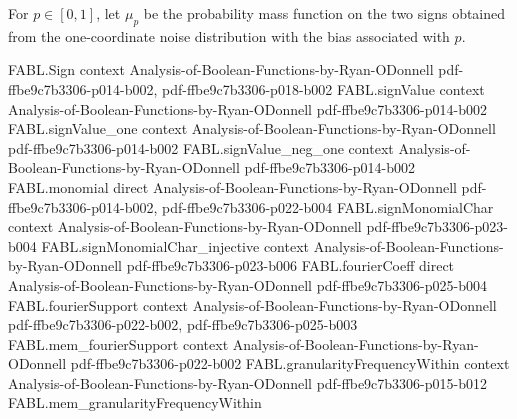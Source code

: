 \begin{definition}
\label{FABL.biasedSignPMF}
\leanok
{}
For $p\in[0,1]$, let $\mu_p$ be the probability mass function on the two signs obtained
from the one-coordinate noise distribution with the bias associated with $p$.
\end{definition}

\begin{theorem}
\label{FABL.biasedSignPMF_apply_one}
\leanok
{}
\proofstep
  {FABL.Sign}
  {context}
  {Analysis-of-Boolean-Functions-by-Ryan-ODonnell}
  {pdf-ffbe9c7b3306-p014-b002,
    pdf-ffbe9c7b3306-p018-b002}
\proofstep
  {FABL.signValue}
  {context}
  {Analysis-of-Boolean-Functions-by-Ryan-ODonnell}
  {pdf-ffbe9c7b3306-p014-b002}
\proofstep
  {FABL.signValue_one}
  {context}
  {Analysis-of-Boolean-Functions-by-Ryan-ODonnell}
  {pdf-ffbe9c7b3306-p014-b002}
\proofstep
  {FABL.signValue_neg_one}
  {context}
  {Analysis-of-Boolean-Functions-by-Ryan-ODonnell}
  {pdf-ffbe9c7b3306-p014-b002}
\proofstep
  {FABL.monomial}
  {direct}
  {Analysis-of-Boolean-Functions-by-Ryan-ODonnell}
  {pdf-ffbe9c7b3306-p014-b002,
    pdf-ffbe9c7b3306-p022-b004}
\proofstep
  {FABL.signMonomialChar}
  {context}
  {Analysis-of-Boolean-Functions-by-Ryan-ODonnell}
  {pdf-ffbe9c7b3306-p023-b004}
\proofstep
  {FABL.signMonomialChar_injective}
  {context}
  {Analysis-of-Boolean-Functions-by-Ryan-ODonnell}
  {pdf-ffbe9c7b3306-p023-b006}
\proofstep
  {FABL.fourierCoeff}
  {direct}
  {Analysis-of-Boolean-Functions-by-Ryan-ODonnell}
  {pdf-ffbe9c7b3306-p025-b004}
\proofstep
  {FABL.fourierSupport}
  {context}
  {Analysis-of-Boolean-Functions-by-Ryan-ODonnell}
  {pdf-ffbe9c7b3306-p022-b002,
    pdf-ffbe9c7b3306-p025-b003}
\proofstep
  {FABL.mem_fourierSupport}
  {context}
  {Analysis-of-Boolean-Functions-by-Ryan-ODonnell}
  {pdf-ffbe9c7b3306-p022-b002}
\proofstep
  {FABL.granularityFrequencyWithin}
  {context}
  {Analysis-of-Boolean-Functions-by-Ryan-ODonnell}
  {pdf-ffbe9c7b3306-p015-b012}
\proofstep
  {FABL.mem_granularityFrequencyWithin}

\end{theorem}
